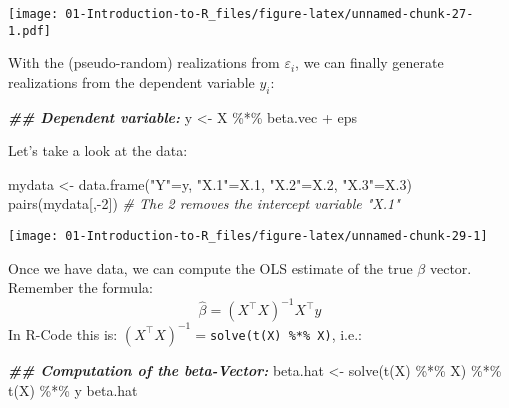 \documentclass[
]{book}
\newenvironment{Shaded}{\begin{snugshade}}{\end{snugshade}}
\newcommand{\CommentTok}[1]{\textcolor[rgb]{0.56,0.35,0.01}{\textit{#1}}}
\newcommand{\DecValTok}[1]{\textcolor[rgb]{0.00,0.00,0.81}{#1}}
\newcommand{\DocumentationTok}[1]{\textcolor[rgb]{0.56,0.35,0.01}{\textbf{\textit{#1}}}}
\newcommand{\FloatTok}[1]{\textcolor[rgb]{0.00,0.00,0.81}{#1}}
\newcommand{\FunctionTok}[1]{\textcolor[rgb]{0.00,0.00,0.00}{#1}}
\newcommand{\NormalTok}[1]{#1}
\newcommand{\OtherTok}[1]{\textcolor[rgb]{0.56,0.35,0.01}{#1}}
\newcommand{\SpecialCharTok}[1]{\textcolor[rgb]{0.00,0.00,0.00}{#1}}
\newcommand{\StringTok}[1]{\textcolor[rgb]{0.31,0.60,0.02}{#1}}
\begin{document}
\texttt{[image: 01-Introduction-to-R\_files/figure-latex/unnamed-chunk-27-1.pdf]}

With the (pseudo-random) realizations from \(\varepsilon_i\), we can finally generate realizations from the dependent variable \(y_i\):

\begin{Shaded}
\begin{Highlighting}[]
\DocumentationTok{\#\# Dependent variable:}
\NormalTok{y   }\OtherTok{\textless{}{-}}\NormalTok{ X }\SpecialCharTok{\%*\%}\NormalTok{ beta.vec }\SpecialCharTok{+}\NormalTok{ eps}
\end{Highlighting}
\end{Shaded}

Let's take a look at the data:

\begin{Shaded}
\begin{Highlighting}[]
\NormalTok{mydata    }\OtherTok{\textless{}{-}} \FunctionTok{data.frame}\NormalTok{(}\StringTok{"Y"}\OtherTok{=}\NormalTok{y, }\StringTok{"X.1"}\OtherTok{=}\NormalTok{X}\FloatTok{.1}\NormalTok{, }\StringTok{"X.2"}\OtherTok{=}\NormalTok{X}\FloatTok{.2}\NormalTok{, }\StringTok{"X.3"}\OtherTok{=}\NormalTok{X}\FloatTok{.3}\NormalTok{)}
\FunctionTok{pairs}\NormalTok{(mydata[,}\SpecialCharTok{{-}}\DecValTok{2}\NormalTok{]) }\CommentTok{\# The \textquotesingle{}{-}2\textquotesingle{} removes the intercept variable "X.1"}
\end{Highlighting}
\end{Shaded}

\begin{center}\texttt{[image: 01-Introduction-to-R\_files/figure-latex/unnamed-chunk-29-1]} \end{center}

\hfill\break

Once we have data, we can compute the OLS estimate of the true \(\beta\) vector. Remember the formula:
\[\hat{\beta}=(X^\top X)^{-1}X^\top y\]
In R-Code this is: \((X^\top X)^{-1}=\)\texttt{solve(t(X)\ \%*\%\ X)}, i.e.:

\begin{Shaded}
\begin{Highlighting}[]
\DocumentationTok{\#\# Computation of the beta{-}Vector:}
\NormalTok{beta.hat }\OtherTok{\textless{}{-}} \FunctionTok{solve}\NormalTok{(}\FunctionTok{t}\NormalTok{(X) }\SpecialCharTok{\%*\%}\NormalTok{ X) }\SpecialCharTok{\%*\%} \FunctionTok{t}\NormalTok{(X) }\SpecialCharTok{\%*\%}\NormalTok{ y}
\NormalTok{beta.hat}
\end{Highlighting}
\end{Shaded}
\end{document}
